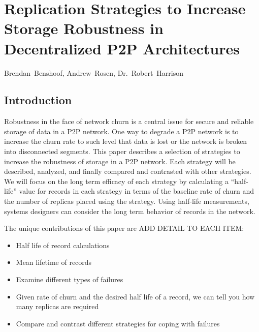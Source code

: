 \chapter{Replication Strategies to Increase Storage Robustness in Decentralized P2P Architectures}
%
%
%
\begin{center}
Brendan~Benshoof, Andrew~Rosen, Dr.~Robert~Harrison
\end{center}

	
	
	\section{Introduction}
	
	Robustness in the face of network churn is a central issue for secure and reliable storage of data in a P2P network. 
	One way to degrade a P2P network is to increase the churn rate to such  level that data is lost or the network is broken into disconnected segments. 
	This paper describes a selection of strategies to increase the robustness of storage in a P2P network.
	Each strategy will be described, analyzed, and finally compared and contrasted with other strategies.
	We will focus on the long term efficacy of each strategy by calculating a ``half-life'' value for records in each strategy in terms of the baseline rate of churn and the number of replicas placed using the strategy.
	Using half-life measurements, systems designers can consider the long term behavior of records in the network.
	
	
	The unique contributions of this paper are ADD DETAIL TO EACH ITEM:
	\begin{itemize}
		
		\item Half life of record calculations
		\item Mean lifetime of records
		\item Examine different types of failures
		\item Given rate of churn and the desired half life  of a record, we can tell you how many replicas are required 
		\item Compare and contrast different strategies for coping with failures
	\end{itemize}
	
